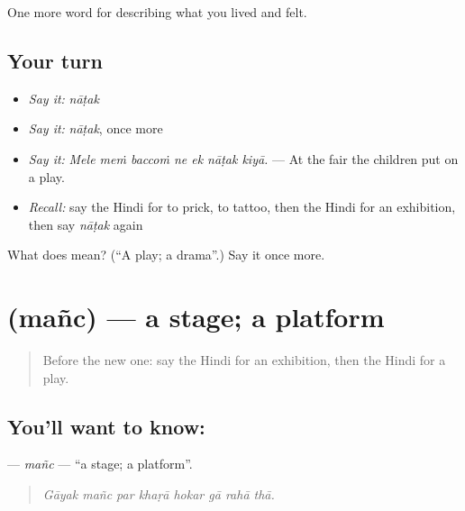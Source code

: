 \begin{grammarlens}[title={What you've built}]
One more word for describing what you lived and felt.
\end{grammarlens}

\subsection*{Your turn}
\begin{itemize}
\raggedright
  \item \emph{Say it:} \emph{nāṭak}
  \item \emph{Say it:} \emph{nāṭak}, once more
  \item \emph{Say it:} \emph{Mele meṁ baccoṁ ne ek nāṭak kiyā.} — At the fair the children put on a play.
  \item \emph{Recall:} say the Hindi for to prick, to tattoo, then the Hindi for an exhibition, then say \emph{nāṭak} again
\end{itemize}

\begin{tcolorbox}[breakable,colback=teal!4,colframe=teal!35!black,title={Before you move on}]
What does  mean? (\textquotedblleft{}A play; a drama\textquotedblright{}.) Say it once more.
\end{tcolorbox}
\section[\texorpdfstring{\hi{मंच} (mañc)}{मंच (mañc)}]{ (mañc) — a stage; a platform}

\label{lesson:HI-C529-manc}



\begin{quote}
Before the new one: say the Hindi for an exhibition, then the Hindi for a play.
\end{quote}

\subsection*{You'll want to know: }
\textbf{} — \emph{mañc} — \textquotedblleft{}a stage; a platform\textquotedblright{}.

\begin{quote}
       
\end{quote}

\begin{quote}
\emph{Gāyak mañc par khaṛā hokar gā rahā thā.}
\end{quote}


